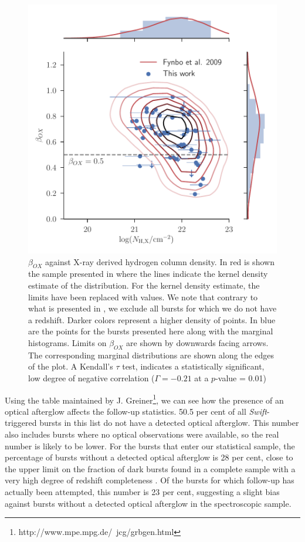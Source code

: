\documentclass[longauth]{aa}    %
\begin{document}
\begin{figure}[!ht]
	\centerline{\includegraphics[width=\columnwidth]{figures/betaOX.pdf}}
\caption{$\beta_{OX}$ against X-ray derived hydrogen column density. In red is
	shown the sample presented in \citet{Fynbo2009} where the lines indicate the
	kernel density estimate of the distribution. For the kernel density estimate,
	the limits have been replaced with values. We note that contrary to what is
	presented in \citet{Fynbo2009}, we exclude all bursts for which we do not have
	a redshift. Darker colors represent a higher density of points. In blue are the
	points for the bursts presented here along with the marginal histograms. Limits
	on $\beta_{OX}$ are shown by downwards facing arrows. The corresponding
	marginal distributions are shown along the edges of the plot. A Kendall's
	$\tau$ test, indicates a statistically significant, low degree of negative
	correlation ($\Gamma = -0.21$ at a $p$-value = 0.01)} \label{fig:betaOX}
\end{figure}

Using the table maintained by
J. Greiner\footnote{http://www.mpe.mpg.de/~jcg/grbgen.html}, we can see how the
presence of an optical afterglow affects the follow-up statistics. 50.5 per cent
of all \textit{Swift}-triggered bursts in this list do not have a detected
optical afterglow. This number also includes bursts where no optical
observations were available, so the real number is likely to be lower. For the
bursts that enter our statistical sample, the percentage of bursts without a
detected optical afterglow is 28 per cent, close to the upper limit on the
fraction of dark bursts found in a complete sample with a very high degree of
redshift completeness \citep{Melandri2012}. Of the bursts for which follow-up
has actually been attempted, this number is 23 per cent, suggesting a slight
bias against bursts without a detected optical afterglow in the spectroscopic
sample.
\end{document}
